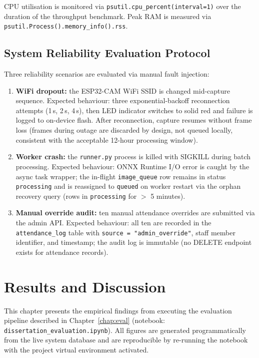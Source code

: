 \documentclass[12pt,a4paper]{report}
\begin{document}
CPU utilisation is monitored via \texttt{psutil.cpu\_percent(interval=1)} over the duration of the throughput benchmark. Peak RAM is measured via \texttt{psutil.Process().memory\_info().rss}.

\section{System Reliability Evaluation Protocol}
\label{sec:eval-reliability}

Three reliability scenarios are evaluated via manual fault injection:

\begin{enumerate}
  \item \textbf{WiFi dropout:} the ESP32-CAM WiFi SSID is changed mid-capture sequence. Expected behaviour: three exponential-backoff reconnection attempts (1\,s, 2\,s, 4\,s), then LED indicator switches to solid red and failure is logged to on-device flash. After reconnection, capture resumes without frame loss (frames during outage are discarded by design, not queued locally, consistent with the acceptable 12-hour processing window).
  \item \textbf{Worker crash:} the \texttt{runner.py} process is killed with SIGKILL during batch processing. Expected behaviour: ONNX Runtime I/O error is caught by the async task wrapper; the in-flight \texttt{image\_queue} row remains in status \texttt{processing} and is reassigned to \texttt{queued} on worker restart via the orphan recovery query (rows in \texttt{processing} for $>$ 5 minutes).
  \item \textbf{Manual override audit:} ten manual attendance overrides are submitted via the admin API. Expected behaviour: all ten are recorded in the \texttt{attendance\_log} table with \texttt{source = "admin\_override"}, staff member identifier, and timestamp; the audit log is immutable (no DELETE endpoint exists for attendance records).
\end{enumerate}

\chapter{Results and Discussion}
\label{chap:results}

This chapter presents the empirical findings from executing the evaluation pipeline described in Chapter~\ref{chap:eval} (notebook: \texttt{dissertation\_evaluation.ipynb}). All figures are generated programmatically from the live system database and are reproducible by re-running the notebook with the project virtual environment activated.
\end{document}
